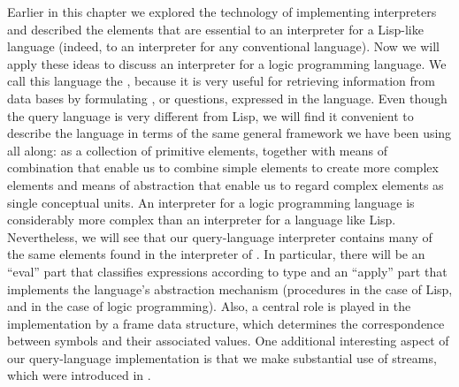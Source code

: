 Earlier in this chapter we explored the technology of implementing interpreters and described the elements that are essential to an interpreter for a Lisp-like language (indeed, to an interpreter for any conventional language).
Now we will apply these ideas to discuss an interpreter for a logic programming language.
We call this language the , because it is very useful for retrieving information from data bases by formulating , or questions, expressed in the language.
Even though the query language is very different from Lisp, we will find it convenient to describe the language in terms of the same general framework we have been using all along:
as a collection of primitive elements, together with means of combination that enable us to combine simple elements to create more complex elements and means of abstraction that enable us to regard complex elements as single conceptual units.
An interpreter for a logic programming language is considerably more complex than an interpreter for a language like Lisp.
Nevertheless, we will see that our query-language interpreter contains many of the same elements found in the interpreter of .
In particular, there will be an “eval” part that classifies expressions according to type and an “apply” part that implements the language’s abstraction mechanism (procedures in the case of Lisp, and  in the case of logic programming).
Also, a central role is played in the implementation by a frame data structure, which determines the correspondence between symbols and their associated values.
One additional interesting aspect of our query-language implementation is that we make substantial use of streams, which were introduced in .





